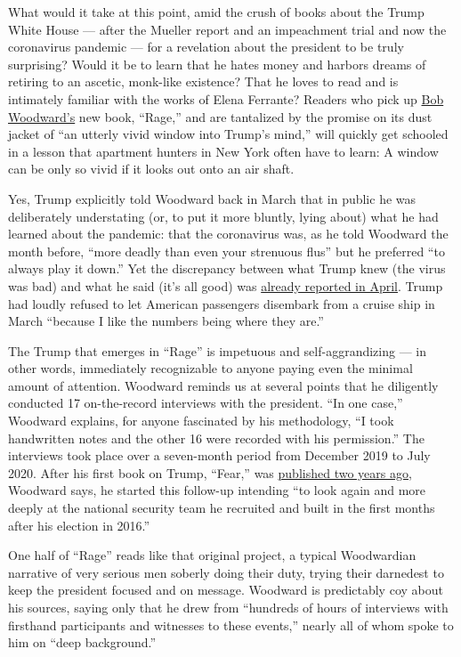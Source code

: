 What would it take at this point, amid the crush of books about the
Trump White House --- after the Mueller report and an impeachment trial
and now the coronavirus pandemic --- for a revelation about the
president to be truly surprising? Would it be to learn that he hates
money and harbors dreams of retiring to an ascetic, monk-like existence?
That he loves to read and is intimately familiar with the works of Elena
Ferrante? Readers who pick up
\href{https://www.nytimes3xbfgragh.onion/2020/09/10/us/politics/trump-woodward.html}{Bob
Woodward's} new book, ``Rage,'' and are tantalized by the promise on its
dust jacket of ``an utterly vivid window into Trump's mind,'' will
quickly get schooled in a lesson that apartment hunters in New York
often have to learn: A window can be only so vivid if it looks out onto
an air shaft.

Yes, Trump explicitly told Woodward back in March that in public he was
deliberately understating (or, to put it more bluntly, lying about) what
he had learned about the pandemic: that the coronavirus was, as he told
Woodward the month before, ``more deadly than even your strenuous flus''
but he preferred ``to always play it down.'' Yet the discrepancy between
what Trump knew (the virus was bad) and what he said (it's all good) was
\href{https://www.nytimes3xbfgragh.onion/2020/04/11/us/politics/coronavirus-trump-response.html}{already
reported in April}. Trump had loudly refused to let American passengers
disembark from a cruise ship in March ``because I like the numbers being
where they are.''

The Trump that emerges in ``Rage'' is impetuous and self-aggrandizing
--- in other words, immediately recognizable to anyone paying even the
minimal amount of attention. Woodward reminds us at several points that
he diligently conducted 17 on-the-record interviews with the president.
``In one case,'' Woodward explains, for anyone fascinated by his
methodology, ``I took handwritten notes and the other 16 were recorded
with his permission.'' The interviews took place over a seven-month
period from December 2019 to July 2020. After his first book on Trump,
``Fear,'' was
\href{https://www.nytimes3xbfgragh.onion/2018/09/05/books/review-fear-trump-in-white-house-bob-woodward.html}{published
two years ago}, Woodward says, he started this follow-up intending ``to
look again and more deeply at the national security team he recruited
and built in the first months after his election in 2016.''

One half of ``Rage'' reads like that original project, a typical
Woodwardian narrative of very serious men soberly doing their duty,
trying their darnedest to keep the president focused and on message.
Woodward is predictably coy about his sources, saying only that he drew
from ``hundreds of hours of interviews with firsthand participants and
witnesses to these events,'' nearly all of whom spoke to him on ``deep
background.''


